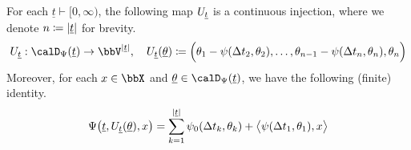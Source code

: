 \begin{proposition}
  \label{proposition:twist-to-moment}
  For each $\underline t \vdash [0,\infty)$, the following map $U_{\underline t}$ is a continuous injection, where we denote $n \coloneqq |\underline t|$ for brevity.
  \begin{equation*}
    \twistToMoment_{\underline t}: \momentSpace(\underline t) \rightarrow \vecSpace^{|\underline t|}, \quad
    \twistToMoment_{\underline t}(\underline\twistVar) \defeq \Big( \twistVar_1 - \affPart(\Delta t_2, \twistVar_2), \ldots, \twistVar_{n-1} - \affPart(\Delta t_n, \twistVar_n), \twistVar_n \Big)
  \end{equation*}
  Moreover, for each $\stateVar \in \stateSpace$ and $\underline\twistVar \in \momentSpace(\underline t)$, we have the following (finite) identity.
  \begin{equation}
    \label{eq:aff-extension}
    \Psi\big(\underline t, U_{\underline t}(\underline{\theta}), x\big) 
    = \sum_{k=1}^{|\underline t|} \psi_0(\Delta t_k, \theta_k) + {\big\langle \psi(\Delta t_1, \theta_1) , x \big\rangle}
  \end{equation}
\end{proposition}
